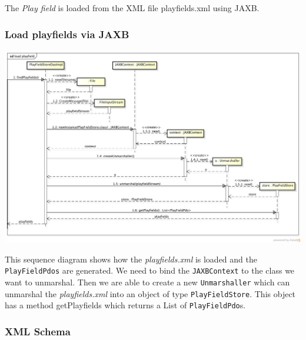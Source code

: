 \documentclass[fontsize=12pt,
               paper=a4,
               twoside=false,
               parskip=half,
               ]{scrartcl}
\begin{document}
The \emph{Play field} is loaded from the XML file playfields.xml using JAXB.

\subsubsection{Load playfields via JAXB}
\includegraphics[width=15.5cm]{./img/jaxb-load-playfield-sd.png}

This sequence diagram shows how the \emph{playfields.xml} is loaded and the \texttt{PlayFieldPdos} are generated.
We need to bind the \texttt{JAXBContext} to the class we want to unmarshal. Then we are able to create a new \texttt{Unmarshaller} which can unmarshal the \emph{playfields.xml} into an object of type \texttt{PlayFieldStore}. This object has a method getPlayfields which returns a List of \texttt{PlayFieldPdo}s.


\subsubsection{XML Schema}
\end{document}
